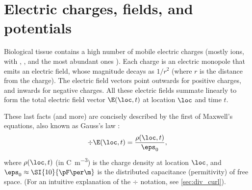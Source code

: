 \section{Electric charges, fields, and potentials}

Biological tissue contains a high number of mobile electric charges (mostly ions, with , , and  the most abundant ones \cite{Martinsen2015a}). Each charge is an electric monopole that emits an electric field, whose magnitude decays as $1/r^2$ (where $r$ is the distance from the charge). The electric field vectors point outwards for positive charges, and inwards for negative charges. All these electric fields summate linearly to form the total electric field vector $\E(\loc,t)$ at location $\loc$ and time $t$.

These last facts (and more) are concisely described by the first of Maxwell's equations, also known as Gauss's law \cite{Feynman2013}:
%
\begin{equation}
\label{eq:gauss}
\div{\E(\loc,t)} = \frac{\rho(\loc,t)}{\eps_0},
\end{equation}
%
where $\rho(\loc,t)$ (in \si{\coulomb\per\metre^3}) is the charge density at location $\loc$, and $\eps_0 \approx \SI{10}{\pF\per\m}$ is the distributed capacitance (permitivity) of free space. (For an intuitive explanation of the $\div$ notation, see \cref{sec:div_curl}).

